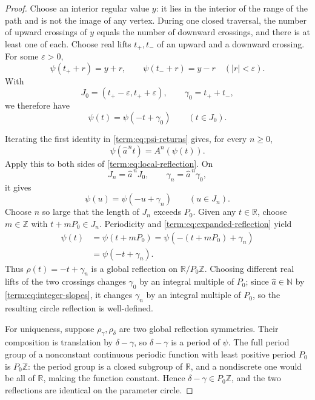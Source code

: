 \documentclass[11pt]{article}
\theoremstyle{definition}
\theoremstyle{remark}
\begin{document}
\begin{proof}
Choose an interior regular value \(y\): it lies in the interior of the range
of the path and is not the image of any vertex.  During one closed traversal,
the number of
upward crossings of \(y\) equals the number of downward crossings, and there
is at least one of each.  Choose real lifts \(t_+,t_-\) of an upward and a downward
crossing.  For some \(\varepsilon>0\),
\[
 \psi(t_++r)=y+r,\qquad
 \psi(t_-+r)=y-r
 \quad (|r|<\varepsilon).
\]
With
\[
 J_0=(t_+-\varepsilon,t_++\varepsilon),
 \qquad \gamma_0=t_++t_-,
\]
we therefore have
\begin{equation}\label{term:eq:local-reflection}
 \psi(t)=\psi(-t+\gamma_0)\qquad(t\in J_0).
\end{equation}

Iterating the first identity in \eqref{term:eq:psi-returns} gives, for every
\(n\geq0\),
\[
 \psi(\widehat a^{\,n}t)=A^n(\psi(t)).
\]
Apply this to both sides of \eqref{term:eq:local-reflection}.  On
\[
 J_n=\widehat a^{\,n}J_0,\qquad
 \gamma_n=\widehat a^{\,n}\gamma_0,
\]
it gives
\begin{equation}\label{term:eq:expanded-reflection}
 \psi(u)=\psi(-u+\gamma_n)\qquad(u\in J_n).
\end{equation}
Choose \(n\) so large that the length of \(J_n\) exceeds \(P_0\).  Given any
\(t\in\mathbb R\), choose \(m\in\mathbb Z\) with \(t+mP_0\in J_n\).
Periodicity and \eqref{term:eq:expanded-reflection} yield
\[
\begin{split}
 \psi(t)
 &=\psi(t+mP_0)
 =\psi(-(t+mP_0)+\gamma_n)\\
 &=\psi(-t+\gamma_n).
\end{split}
\]
Thus \(\rho(t)=-t+\gamma_n\) is a global reflection on
\(\mathbb R/P_0\mathbb Z\).  Choosing different real lifts of the two
crossings changes \(\gamma_0\) by an integral multiple of \(P_0\); since
\(\widehat a\in\mathbb N\) by \eqref{term:eq:integer-slopes}, it changes
\(\gamma_n\) by an integral multiple of \(P_0\), so the resulting circle
reflection is well-defined.

For uniqueness, suppose \(\rho_\gamma,\rho_\delta\) are two global reflection
symmetries.  Their composition is translation by \(\delta-\gamma\), so
\(\delta-\gamma\) is a period of \(\psi\).  The full period group of a
nonconstant continuous periodic function with least positive period \(P_0\)
is \(P_0\mathbb Z\): the period group is a closed subgroup of \(\mathbb R\),
and a nondiscrete one would be all of \(\mathbb R\), making the function
constant.  Hence \(\delta-\gamma\in P_0\mathbb Z\), and the two reflections
are identical on the parameter circle.
\end{proof}
\end{document}
